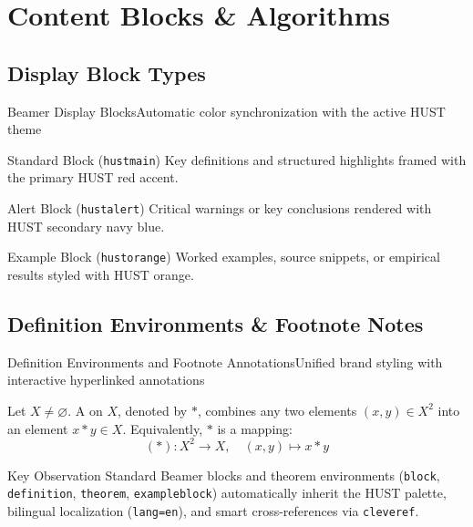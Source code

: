 \documentclass[aspectratio=43,10pt]{beamer}
\begin{document}
\section[Blocks]{Content Blocks \& Algorithms}
\subsection{Display Block Types}
\begin{frame}{Beamer Display Blocks}{Automatic color synchronization with the active HUST theme}
  \begin{block}{Standard Block (\texttt{hustmain})}
    Key definitions and structured highlights framed with the primary HUST red accent.
  \end{block}

  \begin{alertblock}{Alert Block (\texttt{hustalert})}
    Critical warnings or key conclusions rendered with HUST secondary navy blue.
  \end{alertblock}

  \begin{exampleblock}{Example Block (\texttt{hustorange})}
    Worked examples, source snippets, or empirical results styled with HUST orange.
  \end{exampleblock}
\end{frame}

\subsection{Definition Environments \& Footnote Notes}
\begin{frame}{Definition Environments and Footnote Annotations}{Unified brand styling with interactive hyperlinked annotations}
  \begin{definition}
    Let $X \neq \varnothing$. A  on $X$, denoted by $*$, combines any two elements $(x, y) \in X^2$ into an element $x * y \in X$. Equivalently, $*$ is a mapping:
    \[
      (*) : X^2 \longrightarrow X, \quad (x, y) \longmapsto x * y
    \]
  \end{definition}

  \begin{exampleblock}{Key Observation}
    \warning Standard Beamer blocks and theorem environments (\texttt{block}, \texttt{definition}, \texttt{theorem}, \texttt{exampleblock}) automatically inherit the HUST palette, bilingual localization (\texttt{lang=en}), and smart cross-references via \texttt{cleveref}.
  \end{exampleblock}
\end{frame}
\end{document}

